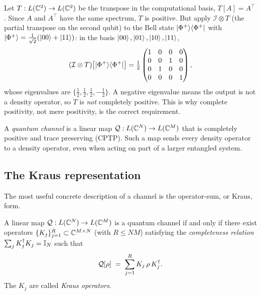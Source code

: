 \begin{example}\label{exa:lec02-transpose}
Let $T:L(\mathbb{C}^{2})\to L(\mathbb{C}^{2})$ be the transpose in the computational basis,
$T[A]=A^{\top}$. Since $A$ and $A^{\top}$ have the same spectrum, $T$ is positive.
But apply $\mathcal{I}\otimes T$ (the partial transpose on the second qubit) to the
Bell state $\ket{\Phi^{+}}\!\bra{\Phi^{+}}$ with $\ket{\Phi^{+}}=\tfrac{1}{\sqrt2}(\ket{00}+\ket{11})$:
in the basis $\ket{00},\ket{01},\ket{10},\ket{11}$,
\[
  (\mathcal{I}\otimes T)\bigl[\ket{\Phi^{+}}\!\bra{\Phi^{+}}\bigr]
   =\tfrac12\begin{pmatrix}1&0&0&0\\0&0&1&0\\0&1&0&0\\0&0&0&1\end{pmatrix},
\]
whose eigenvalues are $\{\tfrac12,\tfrac12,\tfrac12,-\tfrac12\}$. A negative
eigenvalue means the output is not a density operator, so $T$ is \emph{not}
completely positive. This is why complete positivity, not mere positivity, is the
correct requirement.
\end{example}

\begin{definition}\label{def:lec02-channel}
A \emph{quantum channel} is a linear map $\mathcal{Q}:L(\mathbb{C}^{N})\to L(\mathbb{C}^{M})$ that
is completely positive and trace preserving (CPTP). Such a map sends every density
operator to a density operator, even when acting on part of a larger entangled
system.
\end{definition}

\subsection{The Kraus representation}

The most useful concrete description of a channel is the operator-sum, or Kraus,
form.

\begin{theorem}\label{thm:lec02-kraus}
A linear map $\mathcal{Q}:L(\mathbb{C}^{N})\to L(\mathbb{C}^{M})$ is a quantum channel if and only
if there exist operators $\{K_j\}_{j=1}^{R}\subset\mathbb{C}^{M\times N}$ (with $R\le NM$)
satisfying the \emph{completeness relation} $\sum_{j}K_j^{\dagger} K_j=\mathbb{I}_N$ such that
\begin{equation}\label{eq:lec02-kraus}
  \mathcal{Q}[\rho]\;=\;\sum_{j=1}^{R}K_j\,\rho\,K_j^{\dagger} .
\end{equation}
The $K_j$ are called \emph{Kraus operators}.
\end{theorem}

